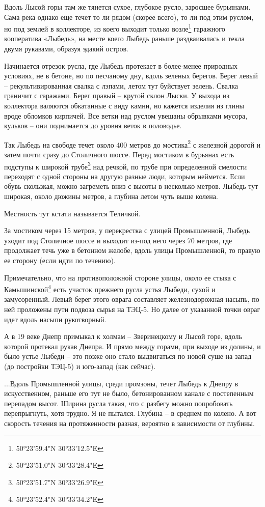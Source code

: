 Вдоль Лысой горы там же тянется сухое, глубокое русло, заросшее бурьянами. Сама река однако еще течет то ли рядом (скорее всего), то ли под этим руслом, но под землей в коллекторе, из коего выходит только возле\footnote{50°23'59.4"N 30°33'12.5"E} гаражного кооператива «Лыбедь», на месте коего Лыбедь раньше раздваивалась и текла двумя рукавами, образуя эдакий остров.

Начинается отрезок русла, где Лыбедь протекает в более-менее природных условиях, не в бетоне, но по песчаному дну, вдоль зеленых берегов. Берег левый – рекультивированная свалка с лэпами, летом тут буйствует зелень. Свалка граничит с гаражами. Берег правый – крутой склон Лыски. У выхода из коллектора валяются обкатанные с виду камни, но кажется изделия из глины вроде обломков кирпичей. Все ветки над руслом увешаны обрывками мусора, кульков – они поднимается до уровня веток в половодье.

Так Лыбедь на свободе течет около 400 метров до мостика\footnote{50°23'51.0"N 30°33'28.4"E} с железной дорогой и затем почти сразу до Столичного шоссе. Перед мостиком в бурьянах есть подступы к широкой трубе\footnote{50°23'51.7"N 30°33'26.9"E} над речкой, по трубе при определенной смелости переходят с одной стороны на другую разные люди, которым неймется. Если обувь скользкая, можно загреметь вниз с высоты в несколько метров. Лыбедь тут широкая, около дюжины метров, а глубина летом чуть выше колена. 

Местность тут кстати называется Теличкой.

За мостиком через 15 метров, у перекрестка с улицей Промышленной, Лыбедь уходит под Столичное шоссе и выходит из-под него через 70 метров, где продолжает течь уже в бетонном желобе, вдоль улицы Промышленной, то правую ее сторону (если идти по течению).

Примечательно, что на противоположной стороне улицы, около ее стыка с Камышинской\footnote{50°23'52.4"N 30°33'34.2"E} есть участок прежнего русла устья Лыбеди, сухой и замусоренный. Левый берег этого оврага составляет железнодорожная насыпь, по ней проложены пути подвоза сырья на ТЭЦ-5. Но далее от указанной точки овраг идет вдоль насыпи рукотворный.

А в 19 веке Днепр примыкал к холмам – Зверинецкому и Лысой горе, вдоль которой протекал рукав Днепра. И прямо между горами, при выходе из долины, и было устье Лыбеди – это позже оно стало выдвигаться по новой суше на запад (до постройки ТЭЦ-5) и юго-запад (как сейчас).

...Вдоль Промышленной улицы, среди промзоны, течет Лыбедь к Днепру в искусственном, раньше его тут не было, бетонированном канале с постепенным перепадом высот. Ширина русла такая, что с разбегу можно попробовать перепрыгнуть, хотя трудно. Я не пытался. Глубина – в среднем по колено. А вот скорость течения на протяженности разная, вероятно в зависимости от глубины.


